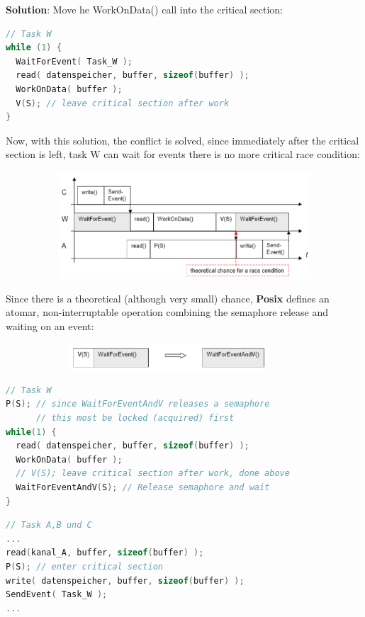\textbf{Solution}: Move he WorkOnData() call into the critical section:

\begin{lstlisting}[style=mystyle, language=c]
// Task W
while (1) {
  WaitForEvent( Task_W );
  read( datenspeicher, buffer, sizeof(buffer) );
  WorkOnData( buffer );
  V(S); // leave critical section after work
}
\end{lstlisting}

Now, with this solution, the conflict is solved, since immediately after the critical section is left, task W can wait for events there is no more critical race condition:

 	\begin{figure}[h]
    \centering
    \includegraphics[width=14cm, height=4cm]{Images/image113.png}
    \label{fig:Fig 60}
    \end{figure}

Since there is a theoretical (although very small) chance, \textbf{Posix} defines an atomar, non-interruptable operation combining the semaphore release and waiting on an event:

 	\begin{figure}[h]
    \centering
    \includegraphics[width=10cm, height=1cm]{Images/image114.png}
    \label{fig:Fig 61}
    \end{figure}
    
\begin{lstlisting}[style=mystyle, language=c]
// Task W
P(S); // since WaitForEventAndV releases a semaphore
      // this most be locked (acquired) first
while(1) {
  read( datenspeicher, buffer, sizeof(buffer) );
  WorkOnData( buffer );
  // V(S); leave critical section after work, done above
  WaitForEventAndV(S); // Release semaphore and wait
}
\end{lstlisting}

\begin{lstlisting}[style=mystyle, language=c]
// Task A,B und C
...
read(kanal_A, buffer, sizeof(buffer) );
P(S); // enter critical section
write( datenspeicher, buffer, sizeof(buffer) );
SendEvent( Task_W );
...
\end{lstlisting}
\nsl{\newpage}

